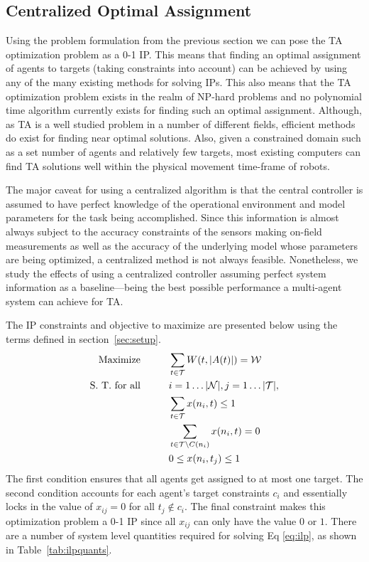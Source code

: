\documentclass[11pt, onecolumn, compsoc, letterpaper]{article}
\newcommand{\Pl}{\mathcal{N}} %
\newcommand{\Ta}{\mathcal{T}} %
\newcommand{\We}{\mathcal{W}} %
\begin{document}
\subsection{Centralized Optimal Assignment}
Using the problem formulation from the previous section we can pose the TA optimization problem as a 0-1 IP. This means that finding an optimal assignment of agents to targets (taking constraints into account) can be achieved by using any of the many existing methods for solving IPs. This also means that the TA optimization problem exists in the realm of NP-hard problems and no polynomial time algorithm currently exists for finding such an optimal assignment. Although, as TA is a well studied problem in a number of different fields, efficient methods do exist for finding near optimal solutions. Also, given a constrained domain such as a set number of agents and relatively few targets, most existing computers can find TA solutions well within the physical movement time-frame of robots. 

The major caveat for using a centralized algorithm is that the central controller is assumed to have perfect knowledge of the operational environment and model parameters for the task being accomplished. Since this information is almost always subject to the accuracy constraints of the sensors making on-field measurements as well as the accuracy of the underlying model whose parameters are being optimized, a centralized method is not always feasible. Nonetheless, we study the effects of using a centralized controller assuming perfect system information as a baseline---being the best possible performance a multi-agent system can achieve for TA.

The IP constraints and objective to maximize are presented below using the terms defined in section~\ref{sec:setup}. 
\begin{align}\label{eq:ilp}
	\text{Maximize}\hspace{1cm} & \sum\limits_{t \in \Ta} W(t, |A(t)|) = \We\\
	\text{S. T. for all}\hspace{1cm} & i = 1\ldots|\Pl|, j = 1\ldots|\Ta|,\notag\\
	& \sum\limits_{t \in \Ta} x(n_i, t) \leq 1\notag\\
	& \sum\limits_{t \in \Ta \backslash C(n_i)} x(n_i, t) = 0\notag\\
	& 0 \leq x(n_i, t_j) \leq 1\notag
\end{align}
The first condition ensures that all agents get assigned to at most one target. The second condition accounts for each agent's target constraints $c_i$ and essentially locks in the value of $x_{ij} = 0$ for all $t_j \not\in c_i$. The final constraint makes this optimization problem a 0-1 IP since all $x_{ij}$ can only have the value $0$ or $1$. There are a number of system level quantities required for solving Eq \eqref{eq:ilp}, as shown in Table~\ref{tab:ilpquants}.
\end{document}
